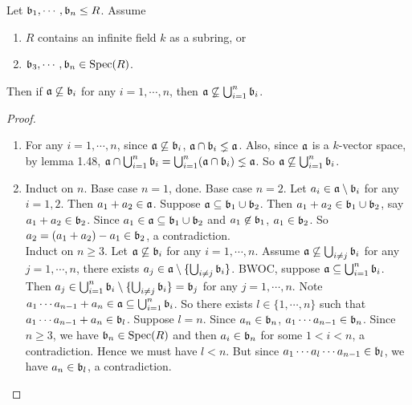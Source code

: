 \begin{theorem}
    Let $\mathfrak{b}_1,\cdots,\mathfrak{b}_n \leq R$. Assume
    \begin{enumerate}[(1)]
        \item $R$ contains an infinite field $k$ as a subring, or
        \item $\mathfrak{b}_3,\cdots,\mathfrak{b}_n \in \operatorname{Spec}(R)$.
    \end{enumerate}
    Then if $\mathfrak{a} \not \subseteq \mathfrak{b}_i$ for any $i = 1,\cdots,n$, then $\mathfrak{a} \not \subsetneq \bigcup_{i=1}^n \mathfrak{b}_i$.
\end{theorem}

\begin{proof}
    \begin{enumerate}[(1)]
        \item For any $i = 1,\cdots,n$, since $\mathfrak{a} \not \subseteq \mathfrak{b}_i$, $\mathfrak{a} \cap \mathfrak{b}_i \lneq \mathfrak{a}$. Also, since $\mathfrak{a}$ is a $k$-vector space, by lemma 1.48, $\mathfrak{a} \cap \bigcup_{i=1}^n \mathfrak{b}_i = \bigcup_{i=1}^n (\mathfrak{a} \cap \mathfrak{b}_i) \lneq \mathfrak{a}$. So $\mathfrak{a} \not \subseteq \bigcup_{i=1}^n \mathfrak{b}_i$. 
        \item Induct on $n$. Base case $n = 1$, done. Base case $n = 2$. Let $a_i \in \mathfrak{a} \setminus \mathfrak{b}_i$ for any $i = 1,2$. Then $a_1 + a_2 \in \mathfrak{a}$. Suppose $\mathfrak{a} \subseteq \mathfrak{b}_1 \cup \mathfrak{b}_2$. Then $a_1 + a_2 \in \mathfrak{b}_1 \cup \mathfrak{b}_2$, say $a_1 + a_2 \in \mathfrak{b}_2$. Since $a_1 \in \mathfrak{a} \subseteq \mathfrak{b}_1 \cup \mathfrak{b}_2$ and $a_1 \not \in \mathfrak{b}_1$, $a_1 \in \mathfrak{b}_2$. So $a_2 = (a_1 + a_2) - a_1 \in \mathfrak{b}_2$, a contradiction. \\
            Induct on $n \geq 3$. Let $\mathfrak{a} \not \subseteq \mathfrak{b}_i$ for any $i = 1,\cdots,n$. Assume $\mathfrak{a} \not \subseteq \bigcup_{i \neq j} \mathfrak{b}_i$ for any $j = 1,\cdots,n$, there exists $a_j \in \mathfrak{a} \setminus \{\bigcup_{i \neq j} \mathfrak{b}_i\}$. BWOC, suppose $\mathfrak{a} \subseteq \bigcup_{i=1}^n \mathfrak{b}_i$. Then $a_j \in \bigcup_{i=1}^n \mathfrak{b}_i \setminus \{\bigcup_{i \neq j}\mathfrak{b}_i\} = \mathfrak{b}_j$ for any $j = 1,\cdots,n$. Note $a_1 \cdots a_{n-1} + a_n \in \mathfrak{a} \subseteq \bigcup_{i=1}^n \mathfrak{b}_i$. So there exists $l \in \{1,\cdots,n\}$ such that $a_1 \cdots a_{n-1} + a_n \in \mathfrak{b}_l$. Suppose $l=n$. Since $a_n \in \mathfrak{b}_n$, $a_1 \cdots a_{n-1} \in \mathfrak{b}_n$. Since $n \geq 3$, we have $\mathfrak{b}_n \in \operatorname{Spec}(R)$ and then $a_i \in \mathfrak{b}_n$ for some $1 < i < n$, a contradiction. Hence we must have $l < n$. But since $a_1 \cdots a_l \cdots a_{n-1} \in \mathfrak{b}_l$, we have $a_n \in \mathfrak{b}_l$, a contradiction.
    \end{enumerate}
\end{proof}


